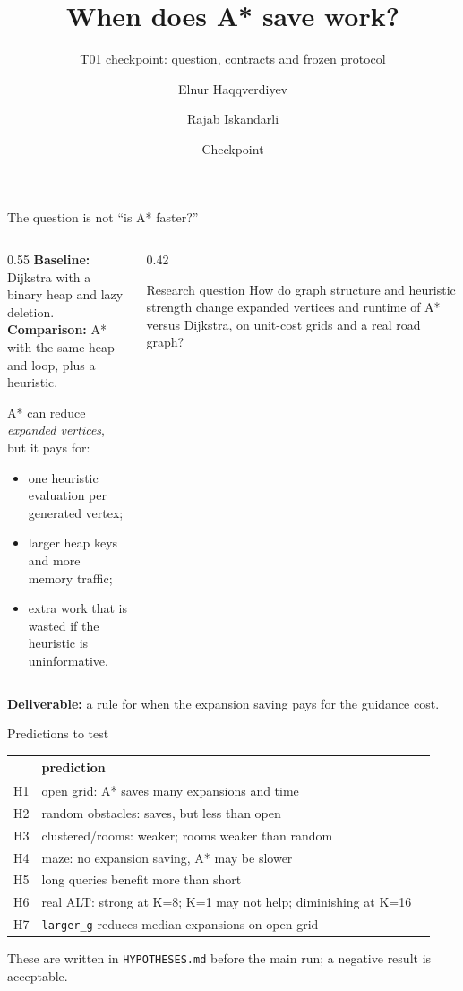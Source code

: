 \documentclass[aspectratio=169,10pt]{beamer}
\title{When does A* save work?}
\subtitle{T01 checkpoint: question, contracts and frozen protocol}
\author[E. Haqqverdiyev, R. Iskandarli]{Elnur Haqqverdiyev \and Rajab Iskandarli}
\institute[UFAZ]{UFAZ, M1 Data Science and AI\\Advanced Data Structures and Algorithms, Fall 2026}
\date{Checkpoint}
\begin{document}
\begin{frame}
  \titlepage
\end{frame}

\begin{frame}{The question is not ``is A* faster?''}
  \begin{columns}[T,onlytextwidth]
    \begin{column}{0.55\textwidth}
      \textbf{Baseline:} Dijkstra with a binary heap and lazy deletion.\\
      \textbf{Comparison:} A* with the same heap and loop, plus a heuristic.
      \vspace{0.4em}

      A* can reduce \emph{expanded vertices}, but it pays for:
      \begin{itemize}
        \item one heuristic evaluation per generated vertex;
        \item larger heap keys and more memory traffic;
        \item extra work that is wasted if the heuristic is uninformative.
      \end{itemize}
    \end{column}
    \begin{column}{0.42\textwidth}
      \begin{block}{Research question}
        How do graph structure and heuristic strength change expanded
        vertices and runtime of A* versus Dijkstra, on unit-cost grids and a
        real road graph?
      \end{block}
    \end{column}
  \end{columns}
  \vspace{0.4em}
  \centering
  \textbf{Deliverable:} a rule for when the expansion saving pays for the
  guidance cost.
\end{frame}

\begin{frame}{Predictions to test}
  \small
  \setlength{\tabcolsep}{4pt}
  \begin{tabular}{p{}p{}p{}}
    \toprule
    & prediction & \\
    \midrule
    H1 & open grid: A* saves many expansions and time & \\
    H2 & random obstacles: saves, but less than open & \\
    H3 & clustered/rooms: weaker; rooms weaker than random & \\
    H4 & maze: no expansion saving, A* may be slower & \\
    H5 & long queries benefit more than short & \\
    H6 & real ALT: strong at K=8; K=1 may not help; diminishing at K=16 & \\
    H7 & \texttt{larger\_g} reduces median expansions on open grid & \\
    \bottomrule
  \end{tabular}
  \vspace{0.8em}

  These are written in \texttt{HYPOTHESES.md} before the main run; a negative
  result is acceptable.
\end{frame}
\end{document}
